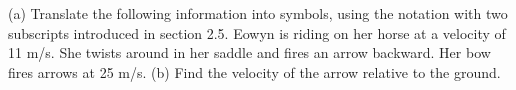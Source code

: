  (a) Translate the following information into symbols,
using the notation with two subscripts introduced in section
2.5. Eowyn is riding on her horse at a velocity of 11 m/s.
She twists around in her saddle and fires an arrow backward.
Her bow fires arrows at 25 m/s. (b) Find the velocity of the
arrow relative to the ground.
